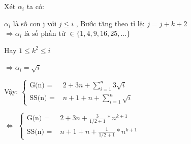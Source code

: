 \documentclass{article}
\newcommand\tab[1][1cm]{\hspace*{#1}}
\begin{document}
\vspace{15mm}
Xét $\alpha_{i}$ ta có:

\tab $\alpha_{i}$ là số con j với $j \leq i $ , \(\text{Bước tăng theo tỉ lệ: } j = j + k + 2\)\\

\(\Rightarrow  \alpha_{i} \text{ là số phần tử } \in \{ 1, 4, 9, 16, 25, ...\}\) 
\vspace{5mm}

Hay $ 1 \leq k^2 \leq i$
\vspace{5mm}

\(\Rightarrow  \alpha_{i} = \sqrt{i}\)


\vspace{5mm}
\tab Vậy:
\(
\begin{cases}
    \text{G(n) = } & 2 + 3n +  \sum\limits_{i=1}^{n}3\sqrt{i} \\
    \text{SS(n) = } &  n + 1 + n  + \sum\limits_{i=1}^{n}\sqrt{i} 
\end{cases}
\)

\vspace{5mm}
\tab  $\Leftrightarrow $
\(
\begin{cases}
    \text{G(n) = } & 2 + 3n +  \frac{3}{1/2 + 1}*n^{k+1} \\

    \text{SS(n) = } &  n + 1 + n  + \frac{1}{1/2 + 1}*n^{k+1} 
\end{cases}
\)
\end{document}

